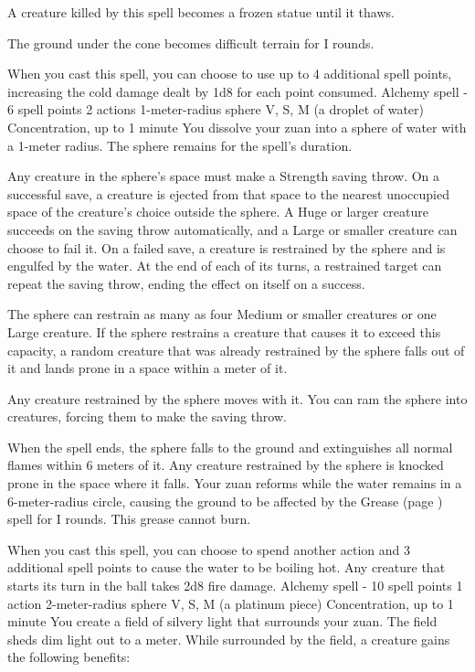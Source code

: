         A creature killed by this spell becomes a frozen statue until it thaws.

        The ground under the cone becomes difficult terrain for I rounds.

        When you cast this spell, you can choose to use up to 4 additional spell points, increasing the cold damage dealt by 1d8 for each point consumed.
        {Alchemy spell - 6 spell points}
        {2 actions}
        {1-meter-radius sphere}
        {V, S, M (a droplet of water)}
        {Concentration, up to 1 minute}
        You dissolve your zuan into a sphere of water with a 1-meter radius.
        The sphere remains for the spell's duration.

        Any creature in the sphere's space must make a Strength saving throw.
        On a successful save, a creature is ejected from that space to the nearest unoccupied space of the creature's choice outside the sphere.
        A Huge or larger creature succeeds on the saving throw automatically, and a Large or smaller creature can choose to fail it.
        On a failed save, a creature is restrained by the sphere and is engulfed by the water.
        At the end of each of its turns, a restrained target can repeat the saving throw, ending the effect on itself on a success.

        The sphere can restrain as many as four Medium or smaller creatures or one Large creature.
        If the sphere restrains a creature that causes it to exceed this capacity, a random creature that was already restrained by the sphere falls out of it and lands prone in a space within a meter of it.

        Any creature restrained by the sphere moves with it.
        You can ram the sphere into creatures, forcing them to make the saving throw.

        When the spell ends, the sphere falls to the ground and extinguishes all normal flames within 6 meters of it.
        Any creature restrained by the sphere is knocked prone in the space where it falls.
        Your zuan reforms while the water remains in a 6-meter-radius circle, causing the ground to be affected by the Grease (page \pageref{spell::grease}) spell for I rounds.
        This grease cannot burn.

        When you cast this spell, you can choose to spend another action and 3 additional spell points to cause the water to be boiling hot.
        Any creature that starts its turn in the ball takes 2d8 fire damage.
        {Alchemy spell - 10 spell points}
        {1 action}
        {2-meter-radius sphere}
        {V, S, M (a platinum piece)}
        {Concentration, up to 1 minute}
        You create a field of silvery light that surrounds your zuan.
        The field sheds dim light out to a meter.
        While surrounded by the field, a creature gains the following benefits:

